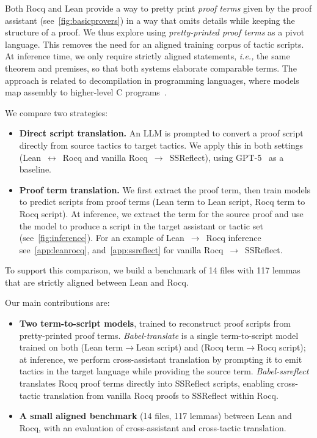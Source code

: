 \documentclass{article}
\theoremstyle{plain}
\theoremstyle{definition}
\theoremstyle{remark}
\newcommand{\ie}{\emph{i.e.,}\xspace}
\begin{document}
	Both Rocq and Lean provide a way to pretty print \emph{proof terms} given by the proof assistant (see~\cref{fig:basicprovers}) in a way that omits details while keeping the structure of a proof. We thus explore using \emph{pretty-printed proof terms} as a pivot language. This removes the need for an aligned training corpus of tactic scripts. At inference time, we only require strictly aligned statements, \ie the same theorem and premises, so that both systems elaborate comparable terms. The approach is related to decompilation in programming languages, where models map assembly to higher-level C programs~\cite{llm4decompile2024}.
	
	We compare two strategies:
	\begin{itemize}
		\item \textbf{Direct script translation.} An LLM is prompted to convert a proof script directly from source tactics to target tactics. We apply this in both settings (Lean~$\leftrightarrow$~Rocq and vanilla Rocq~$\to$~SSReflect), using GPT-5~\cite{gpt52025} as a baseline.
		\item \textbf{Proof term translation.} We first extract the proof term, then train models to predict scripts from proof terms (Lean term to Lean script, Rocq term to Rocq script). At inference, we extract the term for the source proof and use the model to produce a script in the target assistant or tactic set (see~\cref{fig:inference}). For an example of Lean~$\to$~Rocq inference see~\cref{app:leanrocq}, and~\cref{app:ssreflect} for vanilla Rocq~$\to$~SSReflect.
	\end{itemize}
	
	To support this comparison, we build a benchmark of 14 files with 117 lemmas that are strictly aligned between Lean and Rocq. 
	
	Our main contributions are:
	\begin{itemize}
		\item \textbf{Two term-to-script models}, trained to reconstruct proof scripts from pretty-printed proof terms. \textit{Babel-translate} is a single term-to-script model trained on both (Lean term$\to$Lean script) and (Rocq term$\to$Rocq script); at inference, we perform cross-assistant translation by prompting it to emit tactics in the target language while providing the source term. \textit{Babel-ssreflect} translates Rocq proof terms directly into SSReflect scripts, enabling cross-tactic translation from vanilla Rocq proofs to SSReflect within Rocq.
		\item \textbf{A small aligned benchmark} (14 files, 117 lemmas) between Lean and Rocq, with an evaluation of cross-assistant and cross-tactic translation.
                \end{itemize}
                
\end{document}
